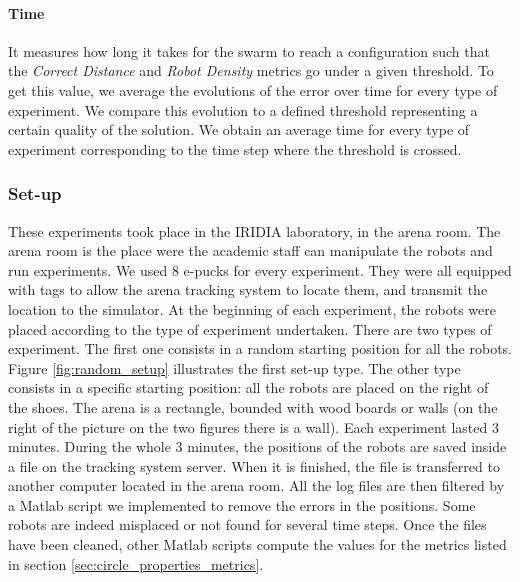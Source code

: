 \documentclass[oneside, a4paper, 12pt]{memoir}
\begin{document}
					
				\paragraph{Time}

				
				It measures how long it takes for the swarm to reach a configuration such that the \emph{Correct Distance} and \emph{Robot Density} metrics go under a given threshold. To get this value, we average the evolutions of the error over time for every type of experiment. We compare this evolution to a defined threshold representing a certain quality of the solution. We obtain an average time for every type of experiment corresponding to the time step where the threshold is crossed.
				
			\subsubsection{Set-up}
			

			
				These experiments took place in the IRIDIA laboratory, in the arena room. The arena room is the place were the academic staff can manipulate the robots and run experiments. We used 8 e-pucks for every experiment. They were all equipped with tags to allow the arena tracking system \citep{stranieri2013iridia} to locate them, and transmit the location to the simulator. At the beginning of each experiment, the robots were placed according to the type of experiment undertaken. There are two types of experiment. The first one consists in a random starting position for all the robots. Figure \ref{fig:random_setup} illustrates the first set-up type. The other type consists in a specific starting position: all the robots are placed on the right of the shoes. The arena is a rectangle, bounded with wood boards or walls (on the right of the picture on the two figures there is a wall). Each experiment lasted 3 minutes. During the whole 3 minutes, the positions of the robots are saved inside a file on the tracking system server. When it is finished, the file is transferred to another computer located in the arena room. All the log files are then filtered by a Matlab script we implemented to remove the errors in the positions. Some robots are indeed misplaced or not found for several time steps. Once the files have been cleaned, other Matlab scripts compute the values for the metrics listed in section \ref{sec:circle_properties_metrics}.
			
\end{document}
